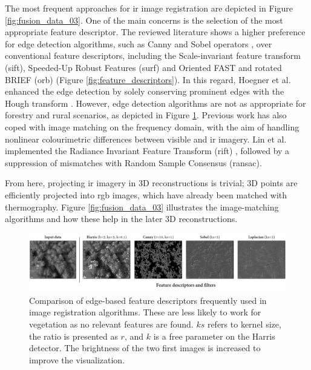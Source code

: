 The most frequent approaches for \acrshort{ir} image registration are depicted in Figure \ref{fig:fusion_data_03}. One of the main concerns is the selection of the most appropriate feature descriptor. The reviewed literature shows a higher preference for edge detection algorithms, such as Canny and Sobel operators \cite{hoegner_3d_2016, hoegner_evaluation_2016}, over conventional feature descriptors, including the Scale-invariant feature transform (\acrshort{sift}), Speeded-Up Robust Features (\acrshort{surf}) and Oriented FAST and rotated BRIEF (\acrshort{orb}) (Figure \ref{fig:feature_descriptors}). In this regard, Hoegner et al. \cite{hoegner_evaluation_2016} enhanced the edge detection by solely conserving prominent edges with the Hough transform \cite{hoegner_evaluation_2016}. However, edge detection algorithms are not as appropriate for forestry and rural scenarios, as depicted in Figure \ref{fig:feature_detection}. Previous work has also coped with image matching on the frequency domain, with the aim of handling nonlinear colourimetric differences between visible and \acrshort{ir} imagery. Lin et al. \cite{lin_fusion_2019} implemented the Radiance Invariant Feature Transform (\acrshort{rift}) \cite{lin_fusion_2019}, followed by a suppression of mismatches with Random Sample Consensus (\acrshort{ransac}).

From here, projecting \acrshort{ir} imagery in 3D reconstructions is trivial; 3D points are efficiently projected into \acrshort{rgb} images, which have already been matched with thermography. Figure \ref{fig:fusion_data_03} illustrates the image-matching algorithms and how these help in the later 3D reconstructions. 

\begin{figure}[ht]
	\includegraphics[width=\linewidth]{figs/context/feature_detection.png}
	\caption{Comparison of edge-based feature descriptors frequently used in image registration algorithms. These are less likely to work for vegetation as no relevant features are found. $\textit{ks}$ refers to kernel size, the ratio is presented as $\textit{r}$, and $\textit{k}$ is a free parameter on the Harris detector. The brightness of the two first images is increased to improve the visualization.}
    \label{fig:feature_detection}
\end{figure}

